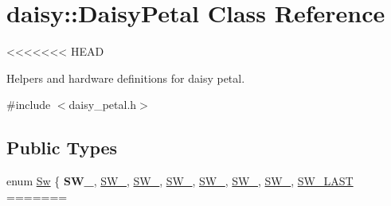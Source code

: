 \hypertarget{classdaisy_1_1_daisy_petal}{}\section{daisy\+:\+:Daisy\+Petal Class Reference}
\label{classdaisy_1_1_daisy_petal}
<<<<<<< HEAD


Helpers and hardware definitions for daisy petal.  




{\ttfamily \#include $<$daisy\+\_\+petal.\+h$>$}

\subsection*{Public Types}
\begin{DoxyCompactItemize}
\item 
enum \hyperlink{classdaisy_1_1_daisy_petal_a2651bb58e6ae33c0bd4bc770df3c7911}{Sw} \{ \newline
{\bfseries S\+W\+\_}, 
\hyperlink{classdaisy_1_1_daisy_petal_a2651bb58e6ae33c0bd4bc770df3c7911a684e6a6ab7d709f8b827c97b2639f2ab}{S\+W\+\_}, 
\hyperlink{classdaisy_1_1_daisy_petal_a2651bb58e6ae33c0bd4bc770df3c7911aa2bd052d217894508a36856ea5843d3e}{S\+W\+\_}, 
\hyperlink{classdaisy_1_1_daisy_petal_a2651bb58e6ae33c0bd4bc770df3c7911acda6031d654ad6b6d6f094419e97968c}{S\+W\+\_}, 
\newline
\hyperlink{classdaisy_1_1_daisy_petal_a2651bb58e6ae33c0bd4bc770df3c7911a9a13b8958600f5421b29017057614f64}{S\+W\+\_}, 
\hyperlink{classdaisy_1_1_daisy_petal_a2651bb58e6ae33c0bd4bc770df3c7911ad45878f759196455d7fa6ee41ed93dc6}{S\+W\+\_}, 
\hyperlink{classdaisy_1_1_daisy_petal_a2651bb58e6ae33c0bd4bc770df3c7911ae2a1269dd381d8c8aa9de3aae9e400f4}{S\+W\+\_}, 
\hyperlink{classdaisy_1_1_daisy_petal_a2651bb58e6ae33c0bd4bc770df3c7911af4668f61ed58c3103b2800d3cf45ca7c}{S\+W\+\_\+\+L\+A\+ST}
=======

\end{DoxyCompactItemize}
